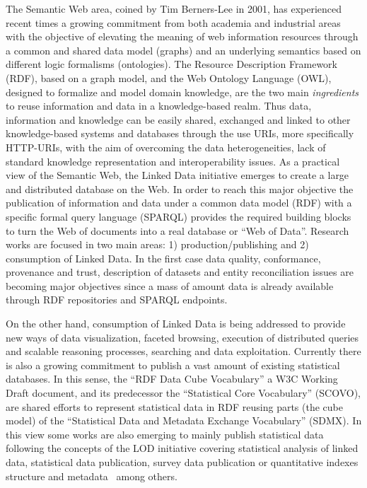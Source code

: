 The Semantic Web area, coined by Tim Berners-Lee in 2001, has experienced recent times a growing 
commitment from both academia and industrial areas  with the objective of elevating the meaning of web 
information resources through a common and shared data model (graphs) and an underlying semantics based 
on different logic formalisms (ontologies). The Resource Description Framework (RDF), based on a graph model, and the Web Ontology Language (OWL), 
designed to formalize and model domain knowledge, are the two main \textit{ingredients} to reuse information and data 
in a knowledge-based realm. Thus data, information and knowledge can be easily shared, exchanged and linked 
to other knowledge-based systems and databases through the use URIs, more specifically HTTP-URIs, with the aim 
of overcoming the data heterogeneities, lack of standard knowledge representation and 
interoperability issues. As a practical view of the Semantic Web, the Linked Data initiative emerges to create a 
large and distributed database on the Web. In order to reach this major objective the publication of information and 
data under a common data model (RDF) with a specific formal query language (SPARQL) provides the required building blocks to turn the Web of documents 
into a real database or ``Web of Data''. Research works are focused in two main areas: 1) production/publishing and 2) consumption of 
Linked Data. In the first case data quality, conformance, provenance and trust, description of datasets and entity reconciliation issues 
are becoming major objectives since a mass of amount data is already available through RDF repositories and SPARQL endpoints. 

On the other hand, consumption of Linked Data is being addressed to provide new ways of data 
visualization, faceted browsing, execution of distributed queries and scalable reasoning processes, searching 
and data exploitation. Currently there is also a growing commitment to publish a vast amount of existing statistical 
databases. In this sense, the ``RDF Data Cube Vocabulary'' a W3C Working Draft document, and its predecessor the ``Statistical Core Vocabulary'' (SCOVO), 
are shared efforts to represent statistical data in RDF reusing parts (the cube model) of the ``Statistical Data and Metadata Exchange Vocabulary'' (SDMX). 
In this view some works are also emerging to mainly publish statistical data following the concepts of the LOD initiative 
covering statistical analysis of linked data, statistical data publication, survey data publication or 
quantitative indexes structure and metadata~\cite{webindexlod} among others.

